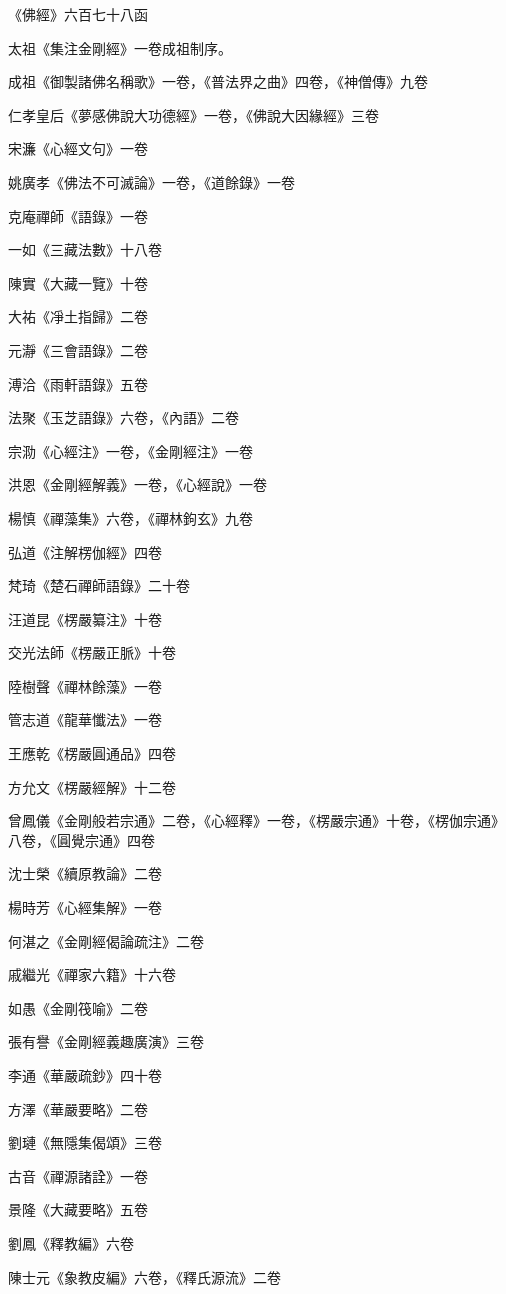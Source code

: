 《佛經》六百七十八函

太祖《集注金剛經》一卷成祖制序。

成祖《御製諸佛名稱歌》一卷，《普法界之曲》四卷，《神僧傳》九卷

仁孝皇后《夢感佛說大功德經》一卷，《佛說大因緣經》三卷

宋濂《心經文句》一卷

姚廣孝《佛法不可滅論》一卷，《道餘錄》一卷

克庵禪師《語錄》一卷

一如《三藏法數》十八卷

陳實《大藏一覽》十卷

大祐《凈土指歸》二卷

元瀞《三會語錄》二卷

溥洽《雨軒語錄》五卷

法聚《玉芝語錄》六卷，《內語》二卷

宗泐《心經注》一卷，《金剛經注》一卷

洪恩《金剛經解義》一卷，《心經說》一卷

楊慎《禪藻集》六卷，《禪林鉤玄》九卷

弘道《注解楞伽經》四卷

梵琦《楚石禪師語錄》二十卷

汪道昆《楞嚴纂注》十卷

交光法師《楞嚴正脈》十卷

陸樹聲《禪林餘藻》一卷

管志道《龍華懺法》一卷

王應乾《楞嚴圓通品》四卷

方允文《楞嚴經解》十二卷

曾鳳儀《金剛般若宗通》二卷，《心經釋》一卷，《楞嚴宗通》十卷，《楞伽宗通》八卷，《圓覺宗通》四卷

沈士榮《續原教論》二卷

楊時芳《心經集解》一卷

何湛之《金剛經偈論疏注》二卷

戚繼光《禪家六籍》十六卷

如愚《金剛筏喻》二卷

張有譽《金剛經義趣廣演》三卷

李通《華嚴疏鈔》四十卷

方澤《華嚴要略》二卷

劉璉《無隱集偈頌》三卷

古音《禪源諸詮》一卷

景隆《大藏要略》五卷

劉鳳《釋教編》六卷

陳士元《象教皮編》六卷，《釋氏源流》二卷

